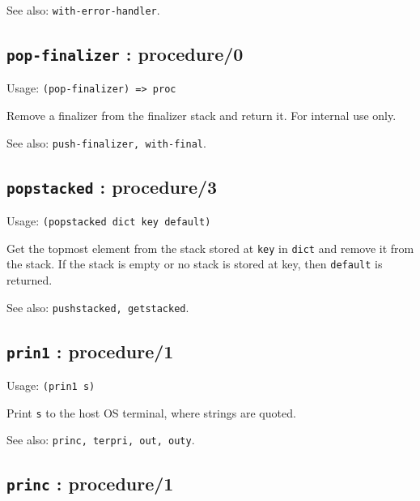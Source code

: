 \documentclass[
]{article}
\newcommand{\passthrough}[1]{#1}
\begin{document}
See also: \passthrough{\lstinline!with-error-handler!}.

\hypertarget{pop-finalizer-procedure0-1}{%
\subsection{\texorpdfstring{\texttt{pop-finalizer} :
procedure/0}{pop-finalizer : procedure/0}}\label{pop-finalizer-procedure0-1}}

Usage: \passthrough{\lstinline!(pop-finalizer) => proc!}

Remove a finalizer from the finalizer stack and return it. For internal
use only.

See also: \passthrough{\lstinline!push-finalizer, with-final!}.

\hypertarget{popstacked-procedure3-1}{%
\subsection{\texorpdfstring{\texttt{popstacked} :
procedure/3}{popstacked : procedure/3}}\label{popstacked-procedure3-1}}

Usage: \passthrough{\lstinline!(popstacked dict key default)!}

Get the topmost element from the stack stored at
\passthrough{\lstinline!key!} in \passthrough{\lstinline!dict!} and
remove it from the stack. If the stack is empty or no stack is stored at
key, then \passthrough{\lstinline!default!} is returned.

See also: \passthrough{\lstinline!pushstacked, getstacked!}.

\hypertarget{prin1-procedure1-1}{%
\subsection{\texorpdfstring{\texttt{prin1} :
procedure/1}{prin1 : procedure/1}}\label{prin1-procedure1-1}}

Usage: \passthrough{\lstinline!(prin1 s)!}

Print \passthrough{\lstinline!s!} to the host OS terminal, where strings
are quoted.

See also: \passthrough{\lstinline!princ, terpri, out, outy!}.

\hypertarget{princ-procedure1-1}{%
\subsection{\texorpdfstring{\texttt{princ} :
procedure/1}{princ : procedure/1}}\label{princ-procedure1-1}}
\end{document}
